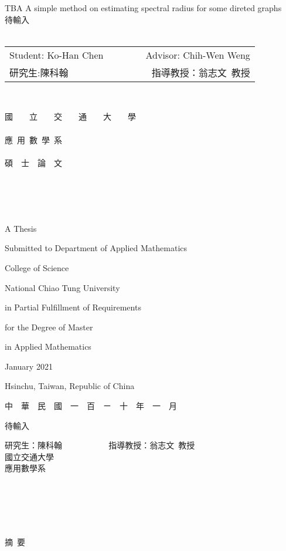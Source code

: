 \documentclass[12pt]{report}%
\renewcommand{\baselinestretch}{1.5} %
\theoremstyle{plain}
\theoremstyle{definition}
\begin{document}
\renewcommand{\baselinestretch}{2} %
\thispagestyle{empty}
\begin{center}
{
\Large
TBA A simple method on estimating spectral radius for some direted graphs\\
待輸入 \\~\\
\begin{tabular}{lccr}
Student: Ko-Han Chen  &&~~~& Advisor: Chih-Wen Weng\\
研究生:陳科翰　 &&~~~& 指導教授：翁志文~教授
\end{tabular}
}~\\

\bigskip

\renewcommand{\baselinestretch}{1} %

{ \LARGE 國~~~~立~~~~交~~~~通~~~~大~~~~學}\\~\\
{ \LARGE 應~用~數~學~系}\\~\\
{ \LARGE 碩~~士~~論~~文}\\~\\~\\~\\~\\
\renewcommand{\baselinestretch}{1} %
{ \large A Thesis

Submitted to Department of Applied Mathematics

College of Science

National Chiao Tung University

in Partial Fulfillment of Requirements

for the Degree of Master

in Applied Mathematics
\bigskip \medskip

January 2021

Hsinchu, Taiwan, Republic of China \bigskip \medskip

 中~~華~~民~~國~~一~~百~~ㄧ~~十~~年~~一~~月 }
\end{center}
\pagebreak

\label{abstract}

\begin{center}
{  \LARGE
待輸入
\bigskip\bigskip\bigskip

研究生：陳科翰  ~~~~~~~~~~ 指導教授：翁志文~教授 \\
國立交通大學  \\
\bigskip
應用數學系
\bigskip\bigskip\bigskip\bigskip
} \\~\\~\\~\\
{\large 摘~要}
\end{center}
 \bigskip
\end{document}
